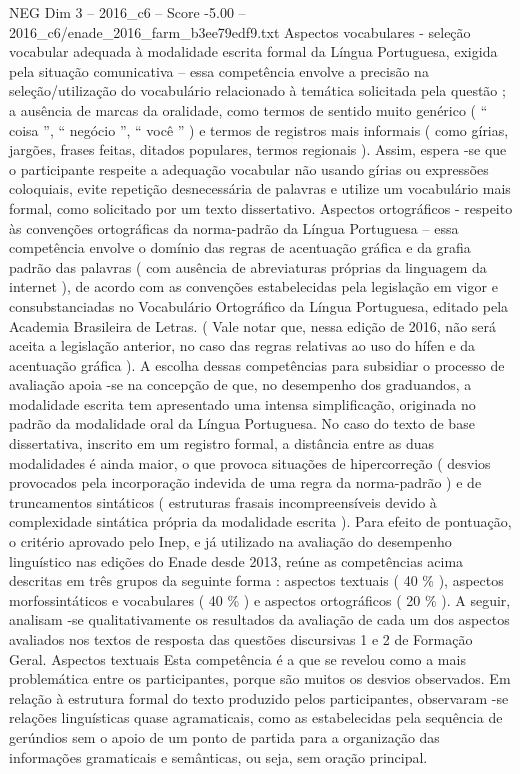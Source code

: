 \begin{textsample}{NEG Dim 3 – 2016\_c6 – Score -5.00 – 2016\_c6/enade\_2016\_farm\_b3ee79edf9.txt}
Aspectos vocabulares - seleção vocabular adequada à modalidade escrita formal da Língua Portuguesa, exigida pela situação comunicativa – essa competência envolve a precisão na seleção/utilização do vocabulário relacionado à temática solicitada pela questão ; a ausência de marcas da oralidade, como termos de sentido muito genérico ( “ coisa ”, “ negócio ”, “ você ” ) e termos de registros mais informais ( como gírias, jargões, frases feitas, ditados populares, termos regionais ).
Assim, espera -se que o participante respeite a adequação vocabular não usando gírias ou expressões coloquiais, evite repetição desnecessária de palavras e utilize um vocabulário mais formal, como solicitado por um texto dissertativo.
Aspectos ortográficos - respeito às convenções ortográficas da norma-padrão da Língua Portuguesa – essa competência envolve o domínio das regras de acentuação gráfica e da grafia padrão das palavras ( com ausência de abreviaturas próprias da linguagem da internet ), de acordo com as convenções estabelecidas pela legislação em vigor e consubstanciadas no Vocabulário Ortográfico da Língua Portuguesa, editado pela Academia Brasileira de Letras. ( Vale notar que, nessa edição de 2016, não será aceita a legislação anterior, no caso das regras relativas ao uso do hífen e da acentuação gráfica ).
A escolha dessas competências para subsidiar o processo de avaliação apoia -se na concepção de que, no desempenho dos graduandos, a modalidade escrita tem apresentado uma intensa simplificação, originada no padrão da modalidade oral da Língua Portuguesa.
No caso do texto de base dissertativa, inscrito em um registro formal, a distância entre as duas modalidades é ainda maior, o que provoca situações de hipercorreção ( desvios provocados pela incorporação indevida de uma regra da norma-padrão ) e de truncamentos sintáticos ( estruturas frasais incompreensíveis devido à complexidade sintática própria da modalidade escrita ).
Para efeito de pontuação, o critério aprovado pelo Inep, e já utilizado na avaliação do desempenho linguístico nas edições do Enade desde 2013, reúne as competências acima descritas em três grupos da seguinte forma : aspectos textuais ( 40 \% ), aspectos morfossintáticos e vocabulares ( 40 \% ) e aspectos ortográficos ( 20 \% ).
A seguir, analisam -se qualitativamente os resultados da avaliação de cada um dos aspectos avaliados nos textos de resposta das questões discursivas 1 e 2 de Formação Geral.
Aspectos textuais Esta competência é a que se revelou como a mais problemática entre os participantes, porque são muitos os desvios observados.
Em relação à estrutura formal do texto produzido pelos participantes, observaram -se relações linguísticas quase agramaticais, como as estabelecidas pela sequência de gerúndios sem o apoio de um ponto de partida para a organização das informações gramaticais e semânticas, ou seja, sem oração principal.

\end{textsample}
